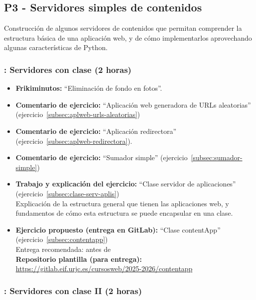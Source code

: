 \documentclass[a4paper,12pt]{article}
\begin{document}
\subsection{P3 - Servidores simples de contenidos}

Construcción de algunos servidores de contenidos que permitan comprender la estructura básica de una aplicación web, y de cómo implementarlos aprovechando algunas características de Python.

\subsubsection{\juevesE: Servidores con clase (2 horas)}
\label{cal:juevesE}

\begin{itemize}
\item \textbf{Frikiminutos:} ``Eliminación de fondo en fotos''.
\item \textbf{Comentario de ejercicio:} ``Aplicación web generadora de URLs aleatorias'' (ejercicio~\ref{subsec:aplweb-urls-aleatorias})
\item \textbf{Comentario de ejercicio:} ``Aplicación redirectora'' (ejercicio~\ref{subsec:aplweb-redirectora}).
\item \textbf{Comentario de ejercicio:} ``Sumador simple'' (ejercicio~\ref{subsec:sumador-simple}) 
\item \textbf{Trabajo y explicación del ejercicio:} ``Clase servidor de aplicaciones'' (ejercicio~\ref{subsec:clase-serv-aplis}) \\
  Explicación de la estructura general que tienen las aplicaciones web, y fundamentos de cómo esta estructura se puede encapsular en una clase.
\item \textbf{Ejercicio propuesto (entrega en GitLab):}  ``Clase contentApp'' (ejercicio~\ref{subsec:contentapp}) \\
  Entrega recomendada: antes de \juevesF \\
  \textbf{Repositorio plantilla (para entrega):} \\
\url{https://gitlab.eif.urjc.es/cursosweb/2025-2026/contentapp}

\end{itemize}


\subsubsection{\juevesF: Servidores con clase II (2 horas)}
\label{cal:juevesF}
\end{document}
